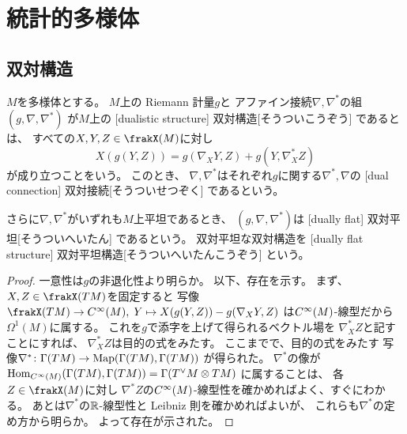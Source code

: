 \documentclass[report]{jlreq}
\begin{document}
%
\chapter{統計的多様体}

%
\section{双対構造}

\begin{definition}[双対構造]
    $M$を多様体とする。
    $M$上の
    Riemann 計量$g$と
    アファイン接続$\nabla, \nabla^*$の組
    $(g, \nabla, \nabla^*)$
    が$M$上の
    [dualistic structure]
        {双対構造}[そうついこうぞう]
    であるとは、
    すべての$X, Y, Z \in \frakX(M)$に対し
    \begin{equation}
        X(g(Y, Z))
            =
                g(\nabla_X Y, Z) + g(Y, \nabla^*_X Z)
    \end{equation}
    が成り立つことをいう。
    このとき、
    $\nabla, \nabla^*$はそれぞれ$g$に関する$\nabla^*, \nabla$の
    [dual connection]
        {双対接続}[そうついせつぞく]
    であるという。

    さらに$\nabla, \nabla^*$がいずれも$M$上平坦であるとき、
    $(g, \nabla, \nabla^*)$は
    [dually flat]
        {双対平坦}[そうついへいたん]
    であるという。
    双対平坦な双対構造を
    [dually flat structure]
        {双対平坦構造}[そうついへいたんこうぞう]
    という。
\end{definition}


\begin{proof}
    一意性は$g$の非退化性より明らか。
    以下、存在を示す。
    まず、$X, Z \in \frakX(TM)$を固定すると
    写像$\frakX(TM) \to \smooth(M), \;
        Y \mapsto X(g(Y, Z)) - g(\nabla_X Y, Z)$
    は$C^\infty(M)$-線型だから$\Omega^1(M)$に属する。
    これを$g$で添字を上げて得られるベクトル場を
    $\nabla^*_X Z$と記すことにすれば、
    $\nabla^*_X Z$は目的の式をみたす。
    ここまでで、目的の式をみたす
    写像$\nabla^* \colon \Gamma(TM) \to \operatorname{Map}(\Gamma(TM), \Gamma(TM))$
    が得られた。
    $\nabla^*$の像が
    $\operatorname{Hom}_{C^\infty(M)}(\Gamma(TM), \Gamma(TM)) = \Gamma(T^\vee M \otimes TM)$
    に属することは、
    各$Z \in \frakX(M)$に対し
    $\nabla^* Z$の$C^\infty(M)$-線型性を確かめればよく、すぐにわかる。
    あとは$\nabla^*$の$\mathbb{R}$-線型性と Leibniz 則を確かめればよいが、
    これらも$\nabla^*$の定め方から明らか。
    よって存在が示された。
\end{proof}
\end{document}
